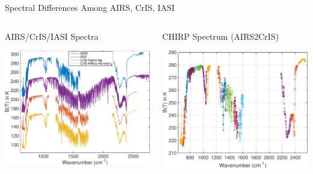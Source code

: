 \documentclass[10pt,t]{beamer}
\begin{document}
\begin{frame}[label={sec:org1c4e432}]{Spectral Differences Among AIRS, CrIS, IASI}
\vspace{-0.2in}
\begin{columns}
\begin{column}{0.55\columnwidth}
\begin{block}{AIRS/CrIS/IASI Spectra}
\begin{center}
\includegraphics[width=\linewidth]{./Figs/Pdf/hyperall_hamming.pdf}
\end{center}
\end{block}
\end{column}


\begin{column}{0.55\columnwidth}
\begin{block}{CHIRP Spectrum (AIRS2CrIS)}
\begin{center}
\includegraphics[width=\linewidth]{./Figs/Pdf/a2c_full.pdf}
\end{center}
\end{block}
\end{column}
\end{columns}


\end{frame}
\end{document}
